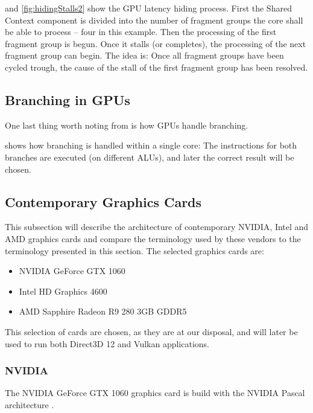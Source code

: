  and \cref{fig:hidingStalls2} show the \gls{GPU} latency hiding process.
First the Shared Context component is divided into the number of fragment groups the core shall be able to process -- four in this example.
Then the processing of the first fragment group is begun. 
Once it stalls (or completes), the processing of the next fragment group can begin.
The idea is: Once all fragment groups have been cycled trough, the cause of the stall of the first fragment group has been resolved.

\subsection{Branching in \glspl{GPU}}
One last thing worth noting from \cite{intro_to_gpu_arch} is how \glspl{GPU} handle branching.


 shows how branching is handled within a single core: The instructions for both branches are executed (on different \glspl{ALU}), and later the correct result will be chosen.

\subsection{Contemporary Graphics Cards} 
This subsection will describe the architecture of  contemporary NVIDIA, Intel and AMD graphics cards and compare the terminology used by these vendors to the terminology presented in this section.
The selected graphics cards are:
\begin{itemize}
	\item NVIDIA GeForce GTX 1060
	\item Intel HD Graphics 4600
	\item AMD Sapphire Radeon R9 280 3GB GDDR5
\end{itemize}

This selection of cards are chosen, as they are at our disposal, and will later be used to run both Direct3D 12 and Vulkan applications.

\subsubsection{NVIDIA}
The NVIDIA GeForce GTX 1060 graphics card is build with the NVIDIA Pascal architecture \cite{nvidia_gtx_1060}.

